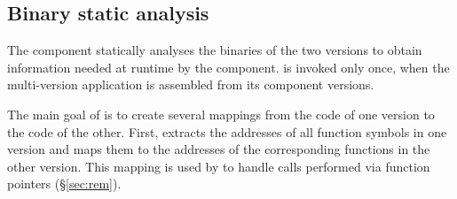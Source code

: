 
\subsection{Binary static analysis}
\label{sec:sea}


The \sea component statically analyses the binaries of the two
versions to obtain information needed at runtime by the \rem
component.  \sea is invoked only once, when the multi-version
application is assembled from its component versions.

The main goal of \sea is to create several mappings from the code of
one version to the code of the other.  First, \sea extracts the
addresses of all function symbols
in one version and maps them to the
addresses of the corresponding functions in the other version.  This
mapping is used by \rem to handle calls performed via function
pointers (\S\ref{sec:rem}).

